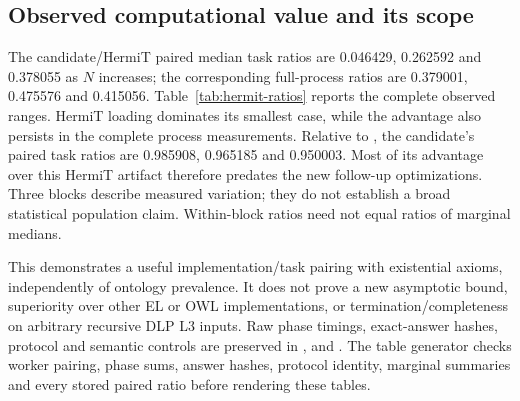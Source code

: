 \subsection{Observed computational value and its scope}
The candidate/HermiT paired median task ratios are 0.046429, 0.262592 and
0.378055 as $N$ increases; the corresponding full-process ratios are
0.379001, 0.475576 and 0.415056. Table~\ref{tab:hermit-ratios} reports the
complete observed ranges. HermiT loading dominates its smallest case, while
the advantage also persists in the complete process measurements. Relative
to , the candidate's paired task ratios are 0.985908, 0.965185
and 0.950003. Most of its advantage over this HermiT artifact therefore
predates the new follow-up optimizations. Three blocks describe measured
variation; they do not establish a broad statistical population claim.
Within-block ratios need not equal ratios of marginal medians.

This demonstrates a useful implementation/task pairing with existential
axioms, independently of ontology prevalence. It does not prove a new
asymptotic bound, superiority over other EL or OWL implementations, or
termination/completeness on arbitrary recursive DLP L3 inputs. Raw phase timings,
exact-answer hashes, protocol and semantic controls are preserved in
,
 and
. The table generator checks worker
pairing, phase sums, answer hashes, protocol identity, marginal summaries and
every stored paired ratio before rendering these tables.
